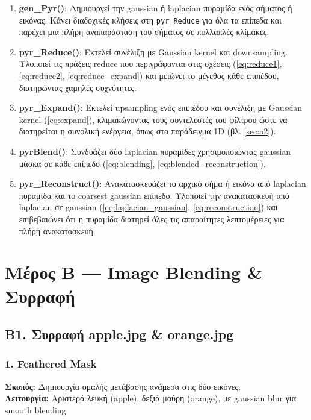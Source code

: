 \documentclass[12pt]{article}
\begin{document}
\begin{enumerate}
    \item \textbf{gen\_Pyr()}: Δημιουργεί την gaussian ή laplacian πυραμίδα ενός σήματος ή εικόνας.  
    Κάνει διαδοχικές κλήσεις στη \texttt{pyr\_Reduce} για όλα τα επίπεδα και παρέχει μια πλήρη αναπαράσταση του σήματος σε πολλαπλές κλίμακες.

    \item \textbf{pyr\_Reduce()}: Εκτελεί συνέλιξη με Gaussian kernel και downsampling. Υλοποιεί τις πράξεις reduce που περιγράφονται στις σχέσεις (\eqref{eq:reduce1}, \eqref{eq:reduce2}, \eqref{eq:reduce_expand})  και μειώνει  το μέγεθος κάθε επιπέδου, διατηρώντας χαμηλές συχνότητες.

    \item \textbf{pyr\_Expand()}:  Εκτελεί upsampling ενός επιπέδου και συνέλιξη με Gaussian kernel (\eqref{eq:expand}),
    κλιμακώνοντας τους συντελεστές του φίλτρου ώστε να διατηρείται η συνολική ενέργεια, όπως στο παράδειγμα 1D (βλ. \ref{sec:a2}). 

    \item \textbf{pyrBlend()}: Συνδυάζει δύο laplacian πυραμίδες χρησιμοποιώντας gaussian μάσκα σε κάθε επίπεδο (\eqref{eq:blending}, \eqref{eq:blended_reconstruction}). 

    \item \textbf{pyr\_Reconstruct()}: Ανακατασκευάζει το αρχικό σήμα ή εικόνα από laplacian πυραμίδα και το coarsest gaussian επίπεδο.  
    Υλοποιεί την ανακατασκευή από laplacian σε gaussian (\eqref{eq:laplacian_gaussian}, \eqref{eq:reconstruction}) και επιβεβαιώνει ότι η πυραμίδα διατηρεί όλες τις απαραίτητες λεπτομέρειες για πλήρη ανακατασκευή.
\end{enumerate}



\section{Μέρος Β — Image Blending \&  Συρραφή} 
\subsection{B1. Συρραφή apple.jpg \&  orange.jpg}

\subsubsection*{1. Feathered Mask}

\textbf{Σκοπός:} Δημιουργία ομαλής μετάβασης ανάμεσα στις δύο εικόνες.
\mbox{}\\
\textbf{Λειτουργία:} Αριστερά λευκή (apple), δεξιά μαύρη (orange), με gaussian blur για smooth blending.
\end{document}
